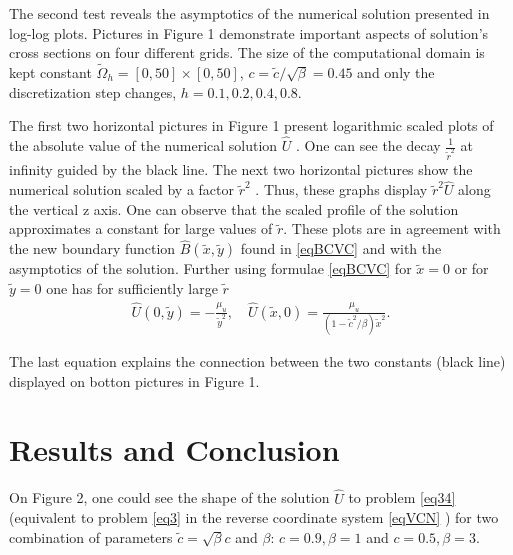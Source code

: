 \documentclass[12pt]{article}
\theoremstyle{theorem}
\theoremstyle{defi}
\begin{document}
The second test reveals the asymptotics of the numerical solution presented in log-log plots. Pictures in Figure 1 demonstrate important aspects of solution's cross sections on four different grids. The size of the computational domain is kept constant  $\tilde \Omega_h = [0, 50]\times[0, 50]$, $c = \tilde c / \sqrt \beta = 0.45$ and only the discretization step changes, $h = 0.1, 0.2, 0.4, 0.8$.

The first two horizontal pictures in Figure 1 present logarithmic scaled plots of the absolute value of the numerical solution $\widehat{U}$  . One can see the decay $\frac{1}{\tilde r^2}$  at infinity guided by the black line. The next two horizontal pictures show the numerical solution scaled by a factor $\tilde r^2$  . Thus, these graphs display  $\tilde r^2\widehat{U}$  along the vertical z axis. One can observe that the scaled profile of the solution approximates a constant for large values of $ \tilde r$.  These plots are in agreement with the new boundary function $\widehat B(\tilde{x} , \tilde y)$ found in \eqref{eqBCVC} and with the asymptotics of the solution. Further using formulae \eqref{eqBCVC}  for $\tilde x = 0$ or for $\tilde y = 0$ one has for sufficiently large $ \tilde r $
\begin{equation}\label{eqCross}
\begin{split}
\widehat{U}(0,\tilde y) = - \frac{\mu_u}{\tilde y^2}, \quad \widehat{U}(\tilde x,0) = \frac{\mu_u}{(1 - \tilde c^2/\beta )\tilde x^2}.
\end{split}
\end{equation}

The last equation explains the connection between the two constants (black line) displayed on botton pictures in Figure 1.


\section{Results and Conclusion}

On Figure 2, one could see the shape of the solution $\widehat U$ to problem  \eqref{eq34} (equivalent to problem \eqref{eq3} in the reverse coordinate system \eqref{eqVCN}  ) for two combination of parameters $\tilde  c = \sqrt \beta c$ and $\beta$:
$c = 0.9, \beta = 1$ and $c = 0.5, \beta = 3$.
\end{document}
